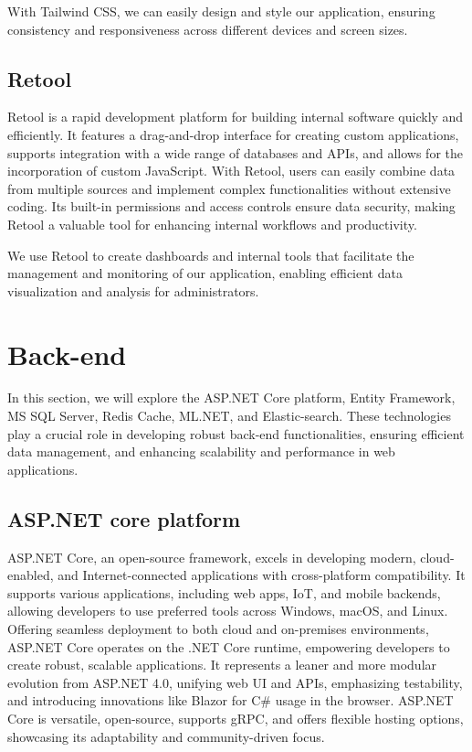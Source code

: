 With Tailwind CSS, we can easily design and style our application,
ensuring consistency and responsiveness across different devices and
screen sizes.

\subsection{Retool}
Retool is a rapid development platform for building internal software 
quickly and efficiently. It features a drag-and-drop interface for creating 
custom applications, supports integration with a wide range of databases and 
APIs, and allows for the incorporation of custom JavaScript. With Retool, 
users can easily combine data from multiple sources and implement complex 
functionalities without extensive coding. Its built-in permissions and access 
controls ensure data security, making Retool a valuable tool for enhancing 
internal workflows and productivity.

We use Retool to create dashboards and internal tools that facilitate
the management and monitoring of our application, enabling efficient
data visualization and analysis for administrators.

\section{Back-end}

In this section, we will explore the ASP.NET Core platform, Entity
Framework, MS SQL Server, Redis Cache, ML.NET, and Elastic-search. These
technologies play a crucial role in developing robust back-end
functionalities, ensuring efficient data management, and enhancing
scalability and performance in web applications.

\subsection{ASP.NET core platform}

ASP.NET Core, an open-source framework, excels in developing modern,
cloud-enabled, and Internet-connected applications with cross-platform
compatibility. It supports various applications, including web apps,
IoT, and mobile backends, allowing developers to use preferred tools
across Windows, macOS, and Linux. Offering seamless deployment to both
cloud and on-premises environments, ASP.NET Core operates on the .NET
Core runtime, empowering developers to create robust, scalable
applications. It represents a leaner and more modular evolution from
ASP.NET 4.0, unifying web UI and APIs, emphasizing testability, and
introducing innovations like Blazor for C\# usage in the browser.
ASP.NET Core is versatile, open-source, supports gRPC, and offers
flexible hosting options, showcasing its adaptability and
community-driven focus.

